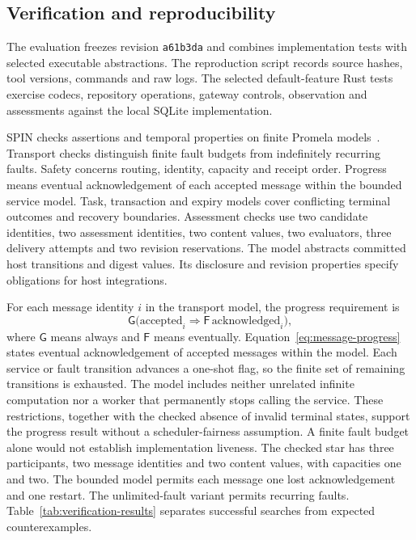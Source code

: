 \documentclass[preprint,12pt,a4paper]{elsarticle}
\newcommand{\code}[1]{\texttt{#1}}
\begin{document}
\subsection{Verification and reproducibility}
The evaluation freezes revision \code{a61b3da} and combines implementation tests with selected executable abstractions. The reproduction script records source hashes, tool versions, commands and raw logs. The selected default-feature Rust tests exercise codecs, repository operations, gateway controls, observation and assessments against the local SQLite implementation.

SPIN checks assertions and temporal properties on finite Promela models~\citep{holzmann1997}. Transport checks distinguish finite fault budgets from indefinitely recurring faults. Safety concerns routing, identity, capacity and receipt order. Progress means eventual acknowledgement of each accepted message within the bounded service model. Task, transaction and expiry models cover conflicting terminal outcomes and recovery boundaries. Assessment checks use two candidate identities, two assessment identities, two content values, two evaluators, three delivery attempts and two revision reservations. The model abstracts committed host transitions and digest values. Its disclosure and revision properties specify obligations for host integrations.

For each message identity $i$ in the transport model, the progress requirement is
\begin{equation}
\mathsf{G}\bigl(\mathrm{accepted}_i\Rightarrow\mathsf{F}\,\mathrm{acknowledged}_i\bigr),
\label{eq:message-progress}
\end{equation}
where $\mathsf{G}$ means always and $\mathsf{F}$ means eventually. Equation~\ref{eq:message-progress} states eventual acknowledgement of accepted messages within the model. Each service or fault transition advances a one-shot flag, so the finite set of remaining transitions is exhausted. The model includes neither unrelated infinite computation nor a worker that permanently stops calling the service. These restrictions, together with the checked absence of invalid terminal states, support the progress result without a scheduler-fairness assumption. A finite fault budget alone would not establish implementation liveness. The checked star has three participants, two message identities and two content values, with capacities one and two. The bounded model permits each message one lost acknowledgement and one restart. The unlimited-fault variant permits recurring faults. Table~\ref{tab:verification-results} separates successful searches from expected counterexamples.
\end{document}
